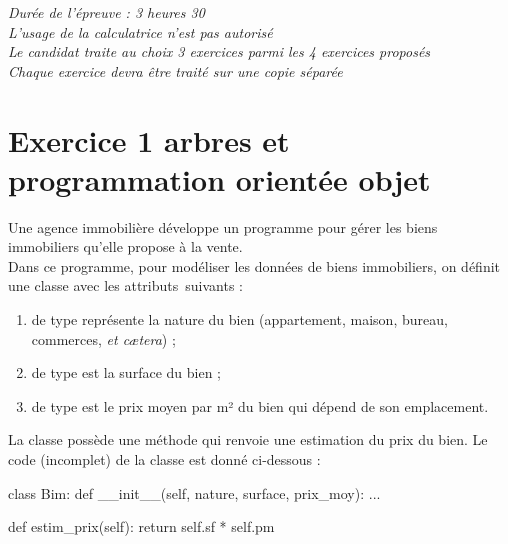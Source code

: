 \documentclass[a4paper,12pt,french]{book}
\begin{document}

    \begin{center}
        \Large
        \vspace{6cm}
        \textit{Durée de l'épreuve : 3 heures 30}\\[2em]

        \textit{L'usage de la calculatrice n'est pas autorisé}\\[2em]


        \textit{Le candidat traite au choix 3 exercices parmi les 4 exercices proposés}\\[2em]

        \textit{Chaque exercice devra être traité sur une copie séparée}
    \end{center}
    \newpage

\section*{Exercice 1 \small{\hfill arbres et programmation orientée objet}}

    Une agence immobilière développe un programme pour gérer les biens immobiliers qu’elle propose à la vente.\\
    Dans ce programme, pour modéliser les données de biens immobiliers, on définit une classe  avec les attributs suivants :
    \begin{enumerate}[--]
        \item 	{} de type  représente la nature du bien (appartement, maison, bureau, commerces, \textit{et c\ae tera}) ;
        \item	{} de type  est la surface du bien ;
        \item 	{} de type  est le prix moyen par m² du bien qui dépend de son emplacement.
    \end{enumerate}

    La classe  possède une méthode  qui renvoie une estimation du prix du bien.
    Le code (incomplet) de la classe  est donné ci-dessous :
\begin{pythoncode}
class Bim:
    def __init__(self, nature, surface, prix_moy):
    ...

    def estim_prix(self):
        return self.sf * self.pm
\end{pythoncode}
\end{document}
